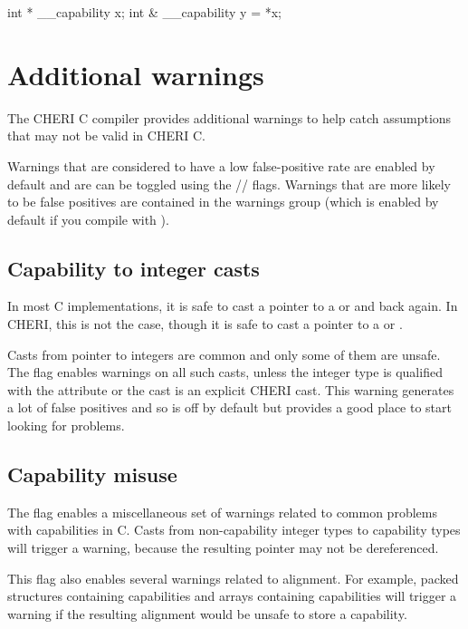 \begin{cxxsnippet}
int * __capability x;
int & __capability y = *x;
\end{cxxsnippet}

\section{Additional warnings}

The CHERI C compiler provides additional warnings to help catch assumptions that may not be valid in CHERI C.

Warnings that are considered to have a low false-positive rate are enabled by default and are can be toggled using the // flags.
Warnings that are more likely to be false positives are contained in the  warnings group (which is enabled by default if you compile with ).

\subsection{Capability to integer casts}

In most C implementations, it is safe to cast a pointer to a  or  and back again.
In CHERI, this is not the case, though it is safe to cast a pointer to a  or .

Casts from pointer to integers are common and only some of them are unsafe.
The  flag enables warnings on all such casts, unless the integer type is qualified with the  attribute or the cast is an explicit CHERI cast.
This warning generates a lot of false positives and so is off by default but provides a good place to start looking for problems.

\subsection{Capability misuse}

The  flag enables a miscellaneous set of warnings related to common problems with capabilities in C.
Casts from non-capability integer types to capability types will trigger a warning, because the resulting pointer may not be dereferenced.

This flag also enables several warnings related to alignment.
For example, packed structures containing capabilities and arrays containing capabilities will trigger a warning if the resulting alignment would be unsafe to store a capability.

